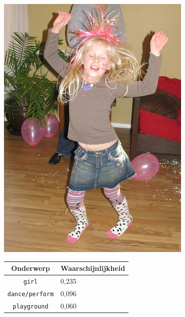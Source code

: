 \begin{figure}[h]
    \centering
    \begin{minipage}[t]{.5\linewidth}
    \centering
    \vspace{0pt}
    \includegraphics[width=\textwidth]{Images/LDA/2282260240.jpg}
    \end{minipage}\hfill
    \begin{minipage}[t]{.5\textwidth}
    \centering
    \vspace{0pt}
    \begin{tabular}{cl}
            Onderwerp                           & Waarschijnlijkheid\\
            \hline
            \texttt{girl}             & 0,235 \\
            \texttt{dance/perform}                   & 0,096 \\
            \texttt{playground}                 & 0,060 \\

\end{tabular}
\end{minipage}
\end{figure}
